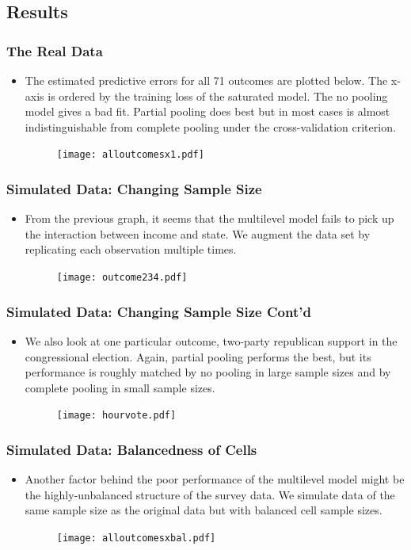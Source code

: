 \documentclass[xetex,mathserif,serif]{beamer}
\begin{document}
\subsection{Results}
\begin{frame}
  \frametitle{The Real Data}
  \begin{itemize}
  \item The estimated predictive errors for all 71 outcomes are plotted
    below. The x-axis is ordered by the training loss of the saturated model. The
    no pooling model gives a bad fit.  Partial pooling does best but in most
    cases is almost indistinguishable from complete pooling under the
    cross-validation criterion.
    \begin{figure}[htbp]
      \centering
      \texttt{[image: alloutcomesx1.pdf]}
    \end{figure}
  \end{itemize}
\end{frame}

\begin{frame}
  \frametitle{Simulated Data: Changing Sample Size}
  \begin{itemize}
  \item From the previous graph, it seems that the multilevel model fails to pick
    up the interaction between income and state. We augment the data set by
    replicating each observation multiple times. 
    \begin{figure}[htbp]
      \centering
      \texttt{[image: outcome234.pdf]}
    \end{figure}
  \end{itemize}
\end{frame}

\begin{frame}
  \frametitle{Simulated Data: Changing Sample Size Cont'd}
  \begin{itemize}
  \item We also look at one particular outcome, two-party republican support in
    the congressional election. Again, partial pooling performs the best, but its
    performance is roughly matched by no pooling in large sample sizes and by
    complete pooling in small sample sizes.
    \begin{figure}[htbp]
      \centering
      \texttt{[image: hourvote.pdf]}
    \end{figure}
  \end{itemize}
\end{frame}

\begin{frame}
  \frametitle{Simulated Data: Balancedness of Cells}
  \begin{itemize}
  \item Another factor behind the poor performance of the multilevel model might
    be the highly-unbalanced structure of the survey data. We simulate data of
    the same sample size as the original data but with balanced cell sample sizes.
    \begin{figure}[htbp]
      \centering
      \texttt{[image: alloutcomesxbal.pdf]}
    \end{figure}
  \end{itemize}
\end{frame}
\end{document}
